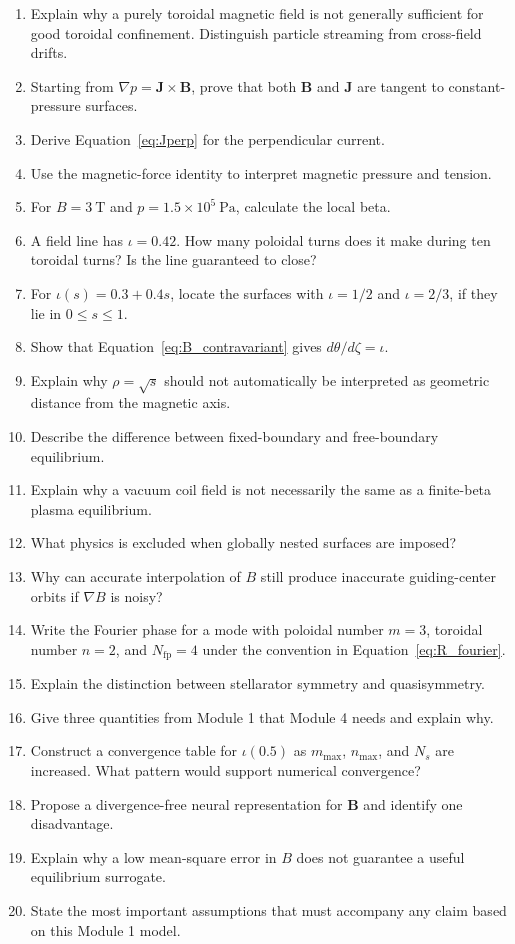 \begin{enumerate}[leftmargin=1.8em]
\item Explain why a purely toroidal magnetic field is not generally sufficient for good toroidal confinement. Distinguish particle streaming from cross-field drifts.
\item Starting from $\nabla p=\mathbf J\times\mathbf B$, prove that both $\mathbf B$ and $\mathbf J$ are tangent to constant-pressure surfaces.
\item Derive Equation~\eqref{eq:Jperp} for the perpendicular current.
\item Use the magnetic-force identity to interpret magnetic pressure and tension.
\item For $B=3\ \mathrm T$ and $p=1.5\times10^5\ \mathrm{Pa}$, calculate the local beta.
\item A field line has $\iota=0.42$. How many poloidal turns does it make during ten toroidal turns? Is the line guaranteed to close?
\item For $\iota(s)=0.3+0.4s$, locate the surfaces with $\iota=1/2$ and $\iota=2/3$, if they lie in $0\leq s\leq1$.
\item Show that Equation~\eqref{eq:B_contravariant} gives $d\theta/d\zeta=\iota$.
\item Explain why $\rho=\sqrt{s}$ should not automatically be interpreted as geometric distance from the magnetic axis.
\item Describe the difference between fixed-boundary and free-boundary equilibrium.
\item Explain why a vacuum coil field is not necessarily the same as a finite-beta plasma equilibrium.
\item What physics is excluded when globally nested surfaces are imposed?
\item Why can accurate interpolation of $B$ still produce inaccurate guiding-center orbits if $\nabla B$ is noisy?
\item Write the Fourier phase for a mode with poloidal number $m=3$, toroidal number $n=2$, and $N_{\mathrm{fp}}=4$ under the convention in Equation~\eqref{eq:R_fourier}.
\item Explain the distinction between stellarator symmetry and quasisymmetry.
\item Give three quantities from Module 1 that Module 4 needs and explain why.
\item Construct a convergence table for $\iota(0.5)$ as $m_{\max}$, $n_{\max}$, and $N_s$ are increased. What pattern would support numerical convergence?
\item Propose a divergence-free neural representation for $\mathbf B$ and identify one disadvantage.
\item Explain why a low mean-square error in $B$ does not guarantee a useful equilibrium surrogate.
\item State the most important assumptions that must accompany any claim based on this Module 1 model.
\end{enumerate}

